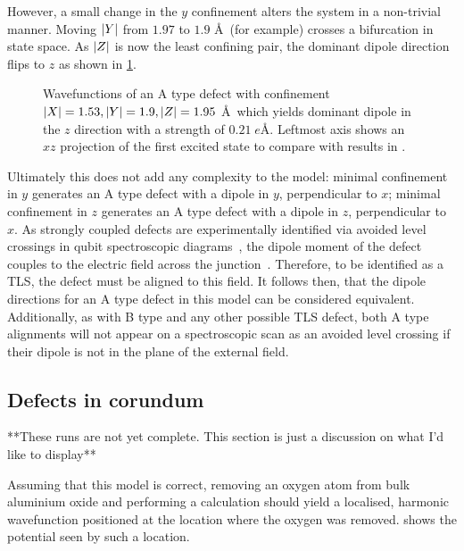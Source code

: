 However, a small change in the $y$ confinement alters the system in a non-trivial manner.
Moving $\lvert Y\rvert$ from $1.97$ to $1.9$ \AA\ (for example) crosses a bifurcation in state space.
As $\lvert Z\rvert$ is now the least confining pair, the dominant dipole direction flips to $z$ as shown in \cref{fig:atypez}.

\begin{figure}[htb]
  \centering
  \caption{\label{fig:atypez}Wavefunctions of an A type defect with confinement $\lvert X\rvert = 1.53, \lvert Y\rvert = 1.9, \lvert Z\rvert = 1.95$ \AA\ which yields dominant dipole in the $z$ direction with a strength of $0.21 \; e$\AA. Leftmost axis shows an $xz$ projection of the first excited state to compare with  results in .}
\end{figure}

Ultimately this does not add any complexity to the model: minimal confinement in $y$ generates an A type defect with a dipole in $y$, perpendicular to $x$; minimal confinement in $z$ generates an A type defect with a dipole in $z$, perpendicular to $x$.
As strongly coupled defects are experimentally identified via avoided level crossings in qubit spectroscopic diagrams~\cite{Lisenfeld2010}, the dipole moment of the defect couples to the electric field across the junction~\cite{Martinis2005}.
Therefore, to be identified as a TLS, the defect must be aligned to this field.
It follows then, that the dipole directions for an A type defect in this model can be considered equivalent.
Additionally, as with B type and any other possible TLS defect, both A type alignments will not appear on a spectroscopic scan as an avoided level crossing if their dipole is not in the plane of the external field.

\subsection{Defects in corundum}\label{sec:corundum}
**These runs are not yet complete. This section is just a discussion on what I'd like to display**

Assuming that this model is correct, removing an oxygen atom from bulk aluminium oxide and performing a calculation should yield a localised, harmonic wavefunction positioned at the location where the oxygen was removed.  shows the potential seen by such a location.

